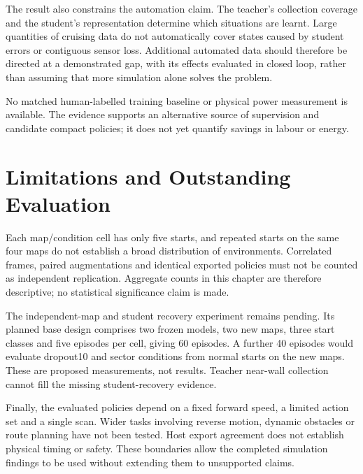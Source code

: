 The result also constrains the automation claim. The teacher's collection
coverage and the student's representation determine which situations are learnt.
Large quantities of cruising data do not automatically cover states caused by
student errors or contiguous sensor loss. Additional automated data should
therefore be directed at a demonstrated gap, with its effects evaluated in
closed loop, rather than assuming that more simulation alone solves the problem.

No matched human-labelled training baseline or physical power measurement is
available. The evidence supports an alternative source of supervision and
candidate compact policies; it does not yet quantify savings in labour or energy.

\section{Limitations and Outstanding Evaluation}
Each map/condition cell has only five starts, and repeated starts on the same
four maps do not establish a broad distribution of environments. Correlated
frames, paired augmentations and identical exported policies must not be
counted as independent replication. Aggregate counts in this chapter are
therefore descriptive; no statistical significance claim is made.

The independent-map and student recovery experiment remains pending. Its
planned base design comprises two frozen models, two new maps, three start
classes and five episodes per cell, giving 60 episodes. A further 40 episodes
would evaluate dropout10 and sector conditions from normal starts on the new
maps. These are proposed measurements, not results. Teacher near-wall
collection cannot fill the missing student-recovery evidence.

Finally, the evaluated policies depend on a fixed forward speed, a limited
action set and a single scan. Wider tasks involving reverse motion, dynamic
obstacles or route planning have not been tested. Host export agreement does
not establish physical timing or safety. These boundaries allow the completed
simulation findings to be used without extending them to unsupported claims.
